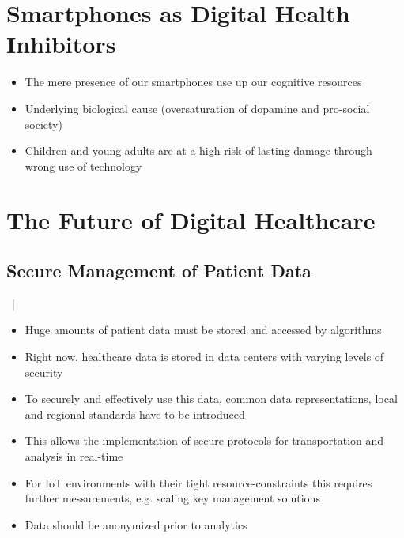 \documentclass[xcolor=dvipsnames, aspectratio=1610]{beamer}
\begin{document}
\section{Smartphones as Digital Health Inhibitors}%
\label{sec:smartphones_as_digital_health_inhibitors}

\begin{frame}{\secname}
    \begin{itemize}[<+->]
        \item The mere presence of our smartphones use up our cognitive resources
        \item Underlying biological cause (oversaturation of dopamine and pro-social society)
        \item Children and young adults are at a high risk of lasting damage through wrong use of technology
    \end{itemize}
\end{frame}

\section{The Future of Digital Healthcare}%
\label{sec:the_future_of_digital_healthcare}

\subsection{Secure Management of Patient Data}%
\label{sub:secure_management_of_patient_data}

\begin{frame}{\secname\ | \subsecname}
    \begin{itemize}[<+->]
        \item Huge amounts of patient data must be stored and accessed by algorithms
        \item Right now, healthcare data is stored in data centers with varying levels of security
        \item To securely and effectively use this data, common data representations, local and regional standards have to be introduced
        \item This allows the implementation of secure protocols for transportation and analysis in real-time
        \item For IoT environments with their tight resource-constraints this requires further messurements, e.g. scaling key management solutions
        \item Data should be anonymized prior to analytics
    \end{itemize}
\end{frame}
\end{document}
